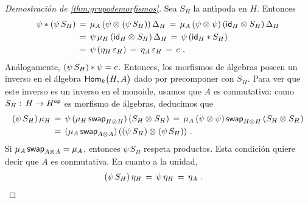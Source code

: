 \begin{proof}[Demostraci\'{o}n de \ref{thm:grupodemorfismos}]
	Sea $S_H$ la ant\'{\i}poda en $H$. Entonces
	\begin{align*}
		\psi\convol (\psi\,S_H) & \,=\,\producto[A]\,
			(\psi\tensor(\psi\,S_H))\,\coproducto[H] \,=\,
			\producto[A]\,(\psi\tensor\psi)\,(\id[H]\tensor S_H)\,
				\coproducto[H] \\
		& \,=\,\psi\,\producto[H]\,(\id[H]\tensor S_H)\,\coproducto[H]
			\,=\,\psi\,(\id[H]\convol S_H) \\
		& \,=\,\psi\,(\unidad[H]\,\counidad[H]) \,=\,
			\unidad[A]\,\counidad[H]\,=\,c
		\text{ .}
	\end{align*}
	An\'{a}logamente, $(\psi\,S_H)\convol\psi=c$. Entonces, los morfismos
	de \'{a}lgebras poseen un inverso en el \'{a}lgebra
	$\Hom[k]\big(H,A\big)$ dado por precomponer con $S_H$. Para ver que
	este inverso es un inverso en el monoide, usamos que $A$ es
	conmutativa: como $S_H:\,H\rightarrow H^\opp$ es morfismo de
	\'{a}lgebras, deducimos que
	\begin{align*}
		(\psi\,S_H)\,\producto[H] & \,=\,\psi\,
			(\producto[H]\,\swap[H\tensor H])\,(S_H\tensor S_H)
			\,=\,\producto[A]\,(\psi\tensor\psi)\,
				\swap[H\tensor H]\,(S_H\tensor S_H) \\
		& \,=\,(\producto[A]\,\swap[A\tensor A])\,
			((\psi\,S_H)\tensor(\psi\,S_H))
		\text{ .}
	\end{align*}
	Si $\producto[A]\,\swap[A\tensor A]=\producto[A]$, entonces $\psi\,S_H$
	respeta productos. Esta condici\'{o}n quiere decir que $A$ es
	conmutativa. En cuanto a la unidad,
	\begin{align*}
		(\psi\,S_H)\,\unidad[H] & \,=\,\psi\,\unidad[H]\,=\,\unidad[A]
		\text{ .}
	\end{align*}
\end{proof}
